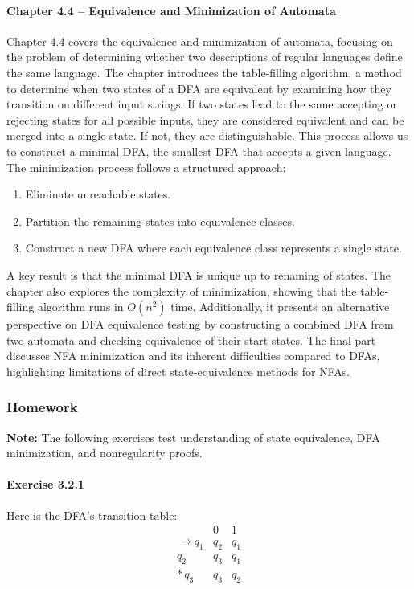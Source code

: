 \documentclass{article}
\theoremstyle{theorem}
\theoremstyle{definition}
\theoremstyle{remark}
\begin{document}
\paragraph*{Chapter 4.4 – Equivalence and Minimization of Automata}
Chapter 4.4 covers the equivalence and minimization of automata, focusing on the problem of determining whether two descriptions of regular languages define the same language. The chapter introduces the table‐filling algorithm, a method to determine when two states of a DFA are equivalent by examining how they transition on different input strings. If two states lead to the same accepting or rejecting states for all possible inputs, they are considered equivalent and can be merged into a single state. If not, they are distinguishable. This process allows us to construct a minimal DFA, the smallest DFA that accepts a given language. The minimization process follows a structured approach:
\begin{enumerate}
  \item Eliminate unreachable states.
  \item Partition the remaining states into equivalence classes.
  \item Construct a new DFA where each equivalence class represents a single state.
\end{enumerate}
A key result is that the minimal DFA is unique up to renaming of states. The chapter also explores the complexity of minimization, showing that the table‐filling algorithm runs in \(O(n^2)\) time. Additionally, it presents an alternative perspective on DFA equivalence testing by constructing a combined DFA from two automata and checking equivalence of their start states. The final part discusses NFA minimization and its inherent difficulties compared to DFAs, highlighting limitations of direct state‐equivalence methods for NFAs.

\subsubsection{Homework}
\textbf{Note:} The following exercises test understanding of state equivalence, DFA minimization, and nonregularity proofs.

\paragraph*{Exercise 3.2.1}
Here is the DFA’s transition table:
\[
\begin{array}{c|cc}
     &0&1\\\hline
\to q_1 & q_2 & q_1\\
      q_2 & q_3 & q_1\\
*\,q_3 & q_3 & q_2
\end{array}
\]
\end{document}
